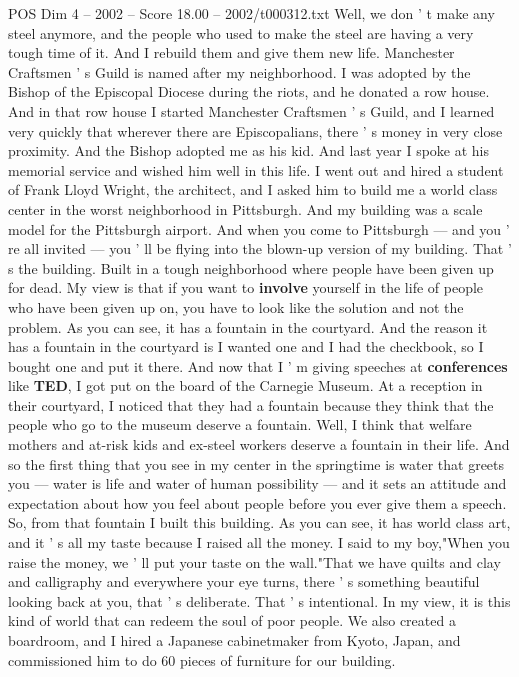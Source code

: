 \begin{textsample}{POS Dim 4 – 2002 – Score 18.00 – 2002/t000312.txt}
Well, we don ' t make any steel anymore, and the people who used to make the steel are having a very tough time of it.
And I rebuild them and give them new life.
Manchester Craftsmen ' s Guild is named after my neighborhood.
I was adopted by the Bishop of the Episcopal Diocese during the riots, and he donated a row house.
And in that row house I started Manchester Craftsmen ' s Guild, and I learned very quickly that wherever there are Episcopalians, there ' s money in very close proximity.
And the Bishop adopted me as his kid.
And last year I spoke at his memorial service and wished him well in this life.
I went out and hired a student of Frank Lloyd Wright, the architect, and I asked him to build me a world class center in the worst neighborhood in Pittsburgh.
And my building was a scale model for the Pittsburgh airport.
And when you come to Pittsburgh — and you ' re all invited — you ' ll be flying into the blown-up version of my building.
That ' s the building.
Built in a tough neighborhood where people have been given up for dead.
My view is that if you want to \textbf{involve} yourself in the life of people who have been given up on, you have to look like the solution and not the problem.
As you can see, it has a fountain in the courtyard.
And the reason it has a fountain in the courtyard is I wanted one and I had the checkbook, so I bought one and put it there.
And now that I ' m giving speeches at \textbf{conferences} like \textbf{TED}, I got put on the board of the Carnegie Museum.
At a reception in their courtyard, I noticed that they had a fountain because they think that the people who go to the museum deserve a fountain.
Well, I think that welfare mothers and at-risk kids and ex-steel workers deserve a fountain in their life.
And so the first thing that you see in my center in the springtime is water that greets you — water is life and water of human possibility — and it sets an attitude and expectation about how you feel about people before you ever give them a speech.
So, from that fountain I built this building.
As you can see, it has world class art, and it ' s all my taste because I raised all the money.
I said to my boy,"When you raise the money, we ' ll put your taste on the wall."That we have quilts and clay and calligraphy and everywhere your eye turns, there ' s something beautiful looking back at you, that ' s deliberate.
That ' s intentional.
In my view, it is this kind of world that can redeem the soul of poor people.
We also created a boardroom, and I hired a Japanese cabinetmaker from Kyoto, Japan, and commissioned him to do 60 pieces of furniture for our building.

\end{textsample}
